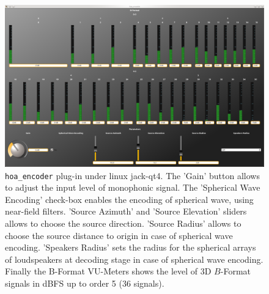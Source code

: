 \documentclass[10pt,a4paper]{article}
\begin{document}
\begin{figure}[!ht]
\includegraphics[width=\columnwidth]{hoa_encoder.png}
\caption{\lstinline'hoa_encoder' plug-in under linux jack-qt4. The 'Gain' button allows to adjust the input level of monophonic signal. The 'Spherical Wave Encoding' check-box enables the encoding of spherical wave, using near-field filters. 'Source Azimuth' and 'Source Elevation' sliders allows to choose the source direction. 'Source Radius' allows to choose the source distance to origin in case of spherical wave encoding. 'Speakers Radius' sets the radius for the spherical arrays of loudspeakers at decoding stage in case of spherical wave encoding. Finally the B-Format VU-Meters shows the level of 3D $B$-Format signals in dBFS up to order 5 (36 signals).}
\label{fig:hoa_encoder}
\end{figure}
\end{document}
